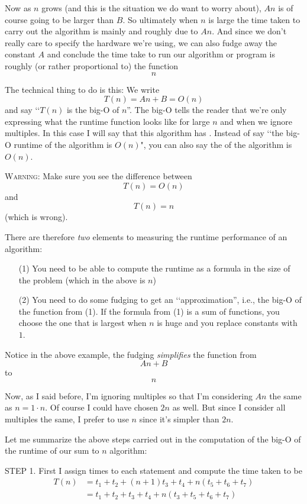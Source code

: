 Now as $n$ grows (and this is the situation we do want 
to worry about), $An$ is of course
going to be larger than $B$. 
So ultimately when $n$ is large the time taken to carry
out the algorithm is mainly and roughly due to $An$.
And since we don't really care to specify the hardware we're using,
we can also fudge away the constant $A$ and conclude the 
time take to run our algorithm or program is roughly 
(or rather proportional to) the function
\[
n
\]


The technical thing to do is this:
We write 
\[
T(n) = An+B = O(n)
\]
and say \lq\lq $T(n)$ is the big-O of $n$''.
The big-O tells the reader that 
we're only expressing what the runtime function looks like
for large $n$ and when we ignore multiples.
In this case I will say that this algorithm has
.
Instead of say \lq\lq the big-O runtime of the algorithm is $O(n)$",
you can also say the
 of the algorithm is $O(n)$.

\textsc{Warning:}
Make sure you see the difference between
\[
T(n) = O(n)
\]
and 
\[
T(n) = n 
\]
(which is wrong).

There are therefore \textit{two} elements to measuring the runtime
performance of an algorithm:
\begin{itemize}
\item[(1)] You need to be able to compute the runtime as a formula
in the size of the problem (which in the above is $n$)
\item[(2)] You need to do some fudging to get an \lq\lq approximation'',
  i.e., the big-O of the function from (1).
  If the formula from (1) is a sum of functions,
  you choose the one that is largest when $n$ is huge
  and you replace constants with $1$.
\end{itemize}

Notice in the above example, the fudging \textit{simplifies} the function from
\[
An + B
\]
to 
\[
n
\]

Now, as I said before,
I'm ignoring multiples so that 
I'm considering $An$ the same as $n = 1 \cdot n$.
Of course I could have chosen $2n$ as well.
But since I consider all multiples the same, I prefer to use $n$
since it's simpler than $2n$.

Let me summarize the above steps carried out in the computation
of the big-O of the runtime of our sum to $n$ algorithm:

STEP 1. First I assign times to each statement and 
compute the time taken to be
\begin{align*}
T(n)
 &= t_1 
    + t_2
    + (n + 1) t_3 
    + t_4
    + n (t_5 + t_6 + t_7)\\
 &= t_1
    + t_2 
    + t_3 
    + t_4 +
    n( t_3 + t_5 + t_6 + t_7 )
\end{align*}


